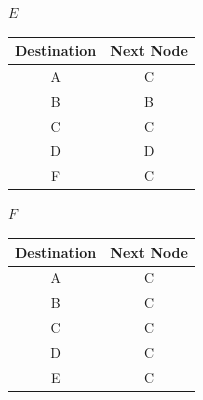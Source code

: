 \documentclass[11pt]{article}
\begin{document}
\begin{solution}
    $E$
    \begin{center}
        \begin{tabular}{ |c|c| } 
        Destination & Next Node \\ 
        \hline  
        A & C  \\ 
        B & B \\ 
        C & C  \\ 
        D & D  \\ 
        F & C  \\ 
        \end{tabular}
    \end{center}
    $F$
    \begin{center}
        \begin{tabular}{ |c|c| } 
        Destination & Next Node \\ 
        \hline  
        A & C  \\ 
        B & C  \\ 
        C & C  \\ 
        D & C  \\ 
        E & C  \\ 
        \end{tabular}
    \end{center}
\end{solution}
\end{document}
